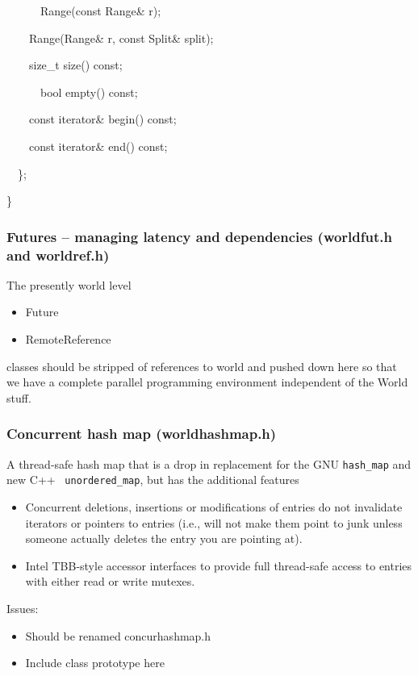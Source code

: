 \documentclass[letterpaper]{article}
\newcommand\liststyleLiii{%
\renewcommand\labelitemi{${\bullet}$}
\renewcommand\labelitemii{${\circ}$}
\renewcommand\labelitemiii{${\blacksquare}$}
\renewcommand\labelitemiv{${\bullet}$}
}
\newcommand\liststyleLiv{%
\renewcommand\labelitemi{${\bullet}$}
\renewcommand\labelitemii{${\circ}$}
\renewcommand\labelitemiii{${\blacksquare}$}
\renewcommand\labelitemiv{${\bullet}$}
}
\newcommand\liststyleLv{%
\renewcommand\labelitemi{${\bullet}$}
\renewcommand\labelitemii{${\circ}$}
\renewcommand\labelitemiii{${\blacksquare}$}
\renewcommand\labelitemiv{${\bullet}$}
}
\begin{document}
\bigskip

{\ttfamily
\ \ \ \ \ \ Range(const Range\& r);}

{\ttfamily
\ \ \ \ Range(Range\& r, const Split\& split);}

{\ttfamily
\ \ \ \ size\_t size() const;}

{\ttfamily
\ \ \ \ \ \ bool empty() const;}

{\ttfamily
\ \ \ \ const iterator\& begin() const;}

{\ttfamily
\ \ \ \ const iterator\& end() const;}

{\ttfamily
\ \ \};}

{\ttfamily
\}}

\subsubsection[Futures {}-- managing latency and dependencies (worldfut.h and worldref.h)]{Futures -- managing latency
and dependencies (worldfut.h and worldref.h)}
The presently world level

\liststyleLiii
\begin{itemize}
\item {\ttfamily
Future}
\item {\ttfamily
RemoteReference}
\end{itemize}
classes should be stripped of references to world and pushed down here so that we have a complete parallel programming
environment independent of the World stuff.

\subsubsection{Concurrent hash map (worldhashmap.h)}
A thread-safe hash map that is a drop in replacement for the GNU \texttt{hash\_map} and new C++
\ \texttt{unordered\_map}, but has the additional features

\liststyleLiv
\begin{itemize}
\item Concurrent deletions, insertions or modifications of entries do not invalidate iterators or pointers to entries
(i.e., will not make them point to junk unless someone actually deletes the entry you are pointing at).
\item Intel TBB-style accessor interfaces to provide full thread-safe access to entries with either read or write
mutexes.
\end{itemize}
Issues:

\liststyleLv
\begin{itemize}
\item Should be renamed concurhashmap.h
\item Include class prototype here
\end{itemize}
\end{document}
